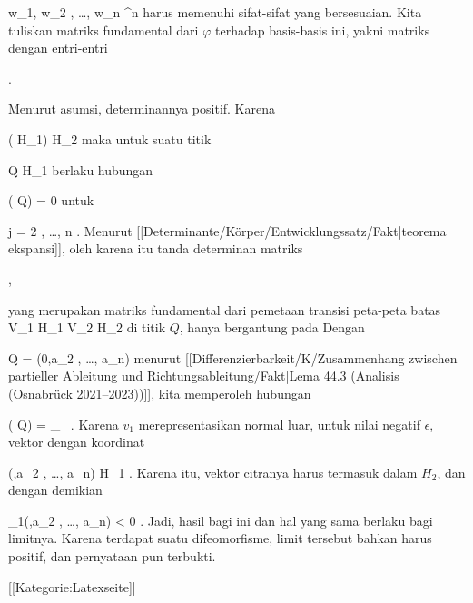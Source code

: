 {\mavergleichskette
{\vergleichskette
{ w_1, w_2 , \ldots , w_n
}
{ \in }{ \R^n
}
{  }{
}
{    }{
}
{   }{
}
}
{}{}{}
harus memenuhi sifat-sifat yang bersesuaian. Kita tuliskan matriks fundamental dari $\varphi$ terhadap basis-basis ini, yakni matriks dengan entri-entri

 { . }

Menurut asumsi, determinannya positif. Karena

\mavergleichskette
{\vergleichskette
{ \varphi ( \partial H_1)
}
{ \subseteq }{ \partial H_2
}
{  }{
}
{    }{
}
{   }{
}
}
{}{}{}
maka untuk suatu titik

\mavergleichskette
{\vergleichskette
{ Q
}
{ \in }{ \partial H_1
}
{  }{
}
{    }{
}
{   }{
}
}
{}{}{}
berlaku hubungan

\mavergleichskettedisp
{\vergleichskette
{ {  } ( Q)
}
{ =} { 0
}
{ } {
}
{ } {
}
{ } {
}
}
{}{}{}
untuk

\mavergleichskette
{\vergleichskette
{ j
}
{ = }{ 2 , \ldots , n
}
{  }{
}
{    }{
}
{   }{
}
}
{}{}{.}
Menurut
[[Determinante/Körper/Entwicklungssatz/Fakt|teorema ekspansi]],
oleh karena itu tanda determinan matriks

 { , }

yang merupakan matriks fundamental dari pemetaan transisi peta-peta batas
\maabbdisp {} {V_1 \cap \partial H_1 } { V_2 \cap \partial H_2
} {}
 {} {}
di titik $Q$, hanya bergantung pada
 Dengan

\mavergleichskette
{\vergleichskette
{ Q
}
{ = }{ (0,a_2 , \ldots , a_n)
}
{  }{
}
{    }{
}
{   }{
}
}
{}{}{}
menurut
[[Differenzierbarkeit/K/Zusammenhang zwischen partieller Ableitung und Richtungsableitung/Fakt|Lema 44.3 (Analisis (Osnabrück 2021--2023))]],
kita memperoleh hubungan

\mavergleichskettedisp
{\vergleichskette
{ {  } ( Q)
}
{ =} { _{   \epsilon {}   } \,  {  }
}
{ } {
}
{ } {
}
{ } {
}
}
{}{}{.}
Karena $v_1$ merepresentasikan normal luar, untuk nilai negatif
 {} {}
$\epsilon$, vektor dengan koordinat

\mavergleichskette
{\vergleichskette
{ (\epsilon,a_2 , \ldots , a_n)
}
{ \in }{ H_1
}
{  }{
}
{    }{
}
{   }{
}
}
{}{}{.}
Karena itu, vektor citranya harus termasuk dalam $H_2$, dan dengan demikian

\mavergleichskette
{\vergleichskette
{ \varphi_1(\epsilon,a_2 , \ldots , a_n)
}
{ < }{ 0
}
{  }{
}
{    }{
}
{   }{
}
}
{}{}{.}
Jadi, hasil bagi ini
 dan hal yang sama berlaku bagi limitnya. Karena terdapat suatu difeomorfisme, limit tersebut bahkan harus positif, dan pernyataan pun terbukti.

}

 [[Kategorie:Latexseite]]
